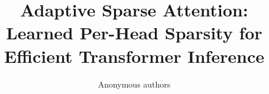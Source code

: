 \title{\textbf{Adaptive Sparse Attention: Learned Per-Head Sparsity for Efficient Transformer Inference}}

\author{Anonymous authors}
